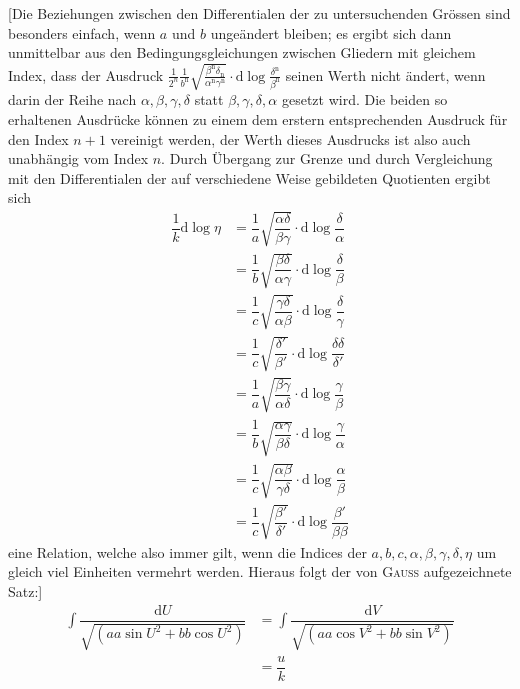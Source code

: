 [Die Beziehungen zwischen den Differentialen der zu untersuchenden Grössen sind besonders einfach,
wenn $a$ und $b$ ungeändert bleiben; es ergibt sich dann unmittelbar aus den Bedingungsgleichungen
zwischen Gliedern mit gleichem Index, dass der Ausdruck
$\frac{1}{2^n}\frac{1}{b^{\mathrm n}}\surd{\frac{\beta^{\mathrm n}\delta_{\mathrm n}}{\alpha^{\mathrm n}\gamma^{\mathrm n}}}\cdot\mathrm{d}\log\frac{\delta^{\mathrm n}}{\beta^{\mathrm n}}$
seinen Werth nicht ändert, wenn darin der Reihe nach $\alpha,\allowbreak \beta,\allowbreak \gamma,\allowbreak \delta$ statt $\beta,\allowbreak \gamma,\allowbreak \delta,\allowbreak \alpha$ gesetzt wird.
Die beiden so erhaltenen Ausdrücke können zu einem dem erstern entsprechenden Ausdruck für den Index $n+1$ vereinigt werden,
der Werth dieses Ausdrucks ist also auch unabhängig vom Index $n$.
Durch Übergang zur Grenze und durch Vergleichung mit den Differentialen der auf verschiedene Weise gebildeten Quotienten ergibt sich
\[
\begin{aligned}\dfrac{1}{k}\mathrm{d}\log\eta
&=\dfrac{1}{a}\surd{\dfrac{\alpha\delta}{\beta\gamma}}\cdot\mathrm{d}\log\dfrac{\delta}{\alpha}
\\[7pt]&=\dfrac{1}{b}\surd{\dfrac{\beta\delta}{\alpha\gamma}}\cdot\mathrm{d}\log\dfrac{\delta}{\beta}
\\[7pt]&=\dfrac{1}{c}\surd{\dfrac{\gamma\delta}{\alpha\beta}}\cdot\mathrm{d}\log\dfrac{\delta}{\gamma}
\\[7pt]&=\dfrac{1}{c}\surd{\dfrac{\delta'}{\beta'}}\cdot\mathrm{d}\log\dfrac{\delta\delta}{\delta'}
\\[7pt]&=\dfrac{1}{a}\surd{\dfrac{\beta\gamma}{\alpha\delta}}\cdot\mathrm{d}\log\dfrac{\gamma}{\beta}
\\[7pt]&=\dfrac{1}{b}\surd{\dfrac{\alpha\gamma}{\beta\delta}}\cdot\mathrm{d}\log\dfrac{\gamma}{\alpha}
\\[7pt]&=\dfrac{1}{c}\surd{\dfrac{\alpha\beta}{\gamma\delta}}\cdot\mathrm{d}\log\dfrac{\alpha}{\beta}
\\[7pt]&=\dfrac{1}{c}\surd{\dfrac{\beta'}{\delta'}}\cdot\mathrm{d}\log\dfrac{\beta'}{\beta\beta}\end{aligned}
\]
eine Relation, welche also immer gilt, wenn die Indices der $a,\allowbreak b,\allowbreak c,\allowbreak \alpha,\allowbreak \beta,\allowbreak \gamma,\allowbreak \delta,\allowbreak \eta$
um gleich viel Einheiten vermehrt werden. Hieraus folgt der von \textsc{Gauss} aufgezeichnete Satz:]
\[
\begin{aligned}\int\dfrac{\mathrm{d}U}{\surd{(aa\sin U^2+bb\cos U^2)}}
&=\int\dfrac{\mathrm{d}V}{\surd{(aa\cos V^2+bb\sin V^2)}}\\[6pt]&=\dfrac{u}{k}\end{aligned}
\]

